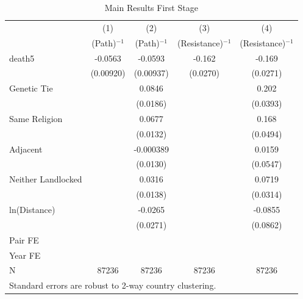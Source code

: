 \documentclass{article}
\begin{document}
\begin{table}[htbp]\centering
\caption{Main Results First Stage \label{tab:MainFirst}}
\begin{tabular}{l*{4}{c}}
\toprule
                    &\multicolumn{1}{c}{(1)}&\multicolumn{1}{c}{(2)}&\multicolumn{1}{c}{(3)}&\multicolumn{1}{c}{(4)}\\
                    &\multicolumn{1}{c}{(Path)$^{-1}$}&\multicolumn{1}{c}{(Path)$^{-1}$}&\multicolumn{1}{c}{(Resistance)$^{-1}$}&\multicolumn{1}{c}{(Resistance)$^{-1}$}\\
\midrule
death5              &     -0.0563&     -0.0593&      -0.162&      -0.169\\
                    &   (0.00920)&   (0.00937)&    (0.0270)&    (0.0271)\\
\addlinespace
Genetic Tie         &            &      0.0846&            &       0.202\\
                    &            &    (0.0186)&            &    (0.0393)\\
\addlinespace
Same Religion       &            &      0.0677&            &       0.168\\
                    &            &    (0.0132)&            &    (0.0494)\\
\addlinespace
Adjacent            &            &   -0.000389&            &      0.0159\\
                    &            &    (0.0130)&            &    (0.0547)\\
\addlinespace
Neither Landlocked  &            &      0.0316&            &      0.0719\\
                    &            &    (0.0138)&            &    (0.0314)\\
\addlinespace
ln(Distance)        &            &     -0.0265&            &     -0.0855\\
                    &            &    (0.0271)&            &    (0.0862)\\
\midrule
Pair FE             &            &            &            &            \\
Year FE             &            &            &            &            \\
N                   &       87236&       87236&       87236&       87236\\
\bottomrule
\multicolumn{5}{l}{\footnotesize Standard errors are robust to 2-way country clustering.}\\
\end{tabular}
\end{table}
\end{document}
